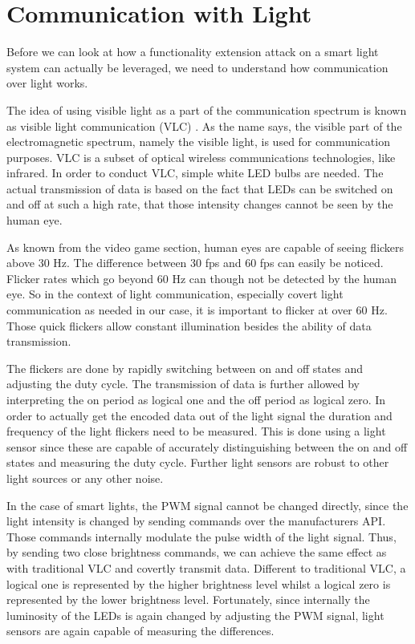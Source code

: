 \section{Communication with Light} %
\label{sec:light_communication}

Before we can look at how a functionality extension attack on a smart light system can actually be leveraged, we need to understand how communication over light works.


The idea of using visible light as a part of the communication spectrum is known as visible light communication (VLC) \cite{Komine:2004:FAfVLCSuLL, Yu:2014:BCDRCVLOS}. As the name says, the visible part of the electromagnetic spectrum, namely the visible light, is used for communication purposes. VLC is a subset of optical wireless communications technologies, like infrared.
In order to conduct VLC, simple white LED bulbs are needed. The actual transmission of data is based on the fact that LEDs can be switched on and off at such a high rate, that those intensity changes cannot be seen by the human eye. 

As known from the video game section, human eyes are capable of seeing flickers above 30 Hz. The difference between 30 fps and 60 fps can easily be noticed. Flicker rates which go beyond 60 Hz can though not be detected by the human eye. So in the context of light communication, especially covert light communication as needed in our case, it is important to flicker at over 60 Hz. Those quick flickers allow constant illumination besides the ability of data transmission.

The flickers are done by rapidly switching between on and off states and adjusting the duty cycle. The transmission of data is further allowed by interpreting the on period as logical one and the off period as logical zero. In order to actually get the encoded data out of the light signal the duration and frequency of the light flickers need to be measured. This is done using a light sensor since these are capable of accurately distinguishing between the on and off states and measuring the duty cycle. Further light sensors are robust to other light sources or any other noise.

In the case of smart lights, the PWM signal cannot be changed directly, since the light intensity is changed by sending commands over the manufacturers API. Those commands internally modulate the pulse width of the light signal. Thus, by sending two close brightness commands, we can achieve the same effect as with traditional VLC and covertly transmit data. Different to traditional VLC, a logical one is represented by the higher brightness level whilst a logical zero is represented by the lower brightness level. Fortunately, since internally the luminosity of the LEDs is again changed by adjusting the PWM signal, light sensors are again capable of measuring the differences. 

